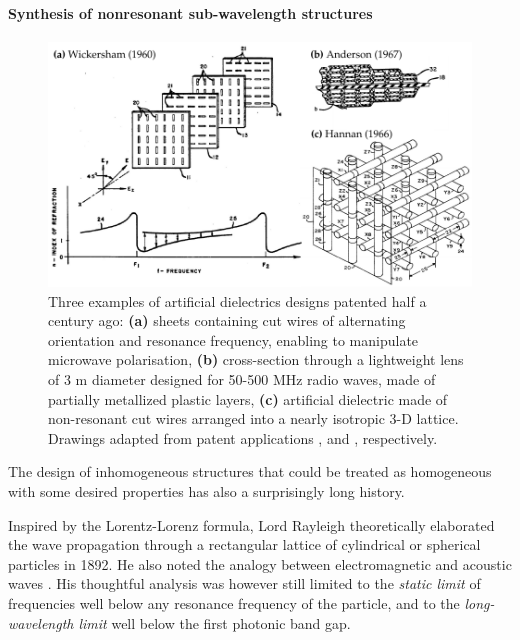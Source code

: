 \paragraph{Synthesis of nonresonant sub-wavelength structures} %
\begin{figure}[h] \caption{Three examples of artificial dielectrics designs patented half a century ago: \textbf{(a)} sheets containing cut wires of alternating orientation and resonance frequency, enabling to manipulate microwave polarisation, \textbf{(b)} cross-section through a lightweight lens of 3 m diameter designed for 50-500 MHz radio waves, made of partially metallized plastic layers, \textbf{(c)} artificial dielectric made of non-resonant cut wires arranged into a nearly isotropic 3-D lattice. Drawings adapted from patent applications \cite{wickersham1960artificial},  \cite{anderson1967artificial} and \cite{hannan1966artificial}, respectively.} \label{fg_mm_patents} \centering \includegraphics[width=\textwidth]{img/patents/mm_patents.pdf} \end{figure}

The design of inhomogeneous structures that could be treated as homogeneous with some desired properties has also a surprisingly long history. 

Inspired by the Lorentz-Lorenz formula, Lord Rayleigh theoretically elaborated the wave propagation through a rectangular lattice of cylindrical or spherical particles in 1892. He also noted the analogy between electromagnetic and acoustic waves \cite[p. 498]{rayleigh1892}. His thoughtful analysis was however still limited to the \textit{static limit} of frequencies well below any resonance frequency of the particle, and to the \textit{long-wavelength limit} well below the first photonic band gap. 


